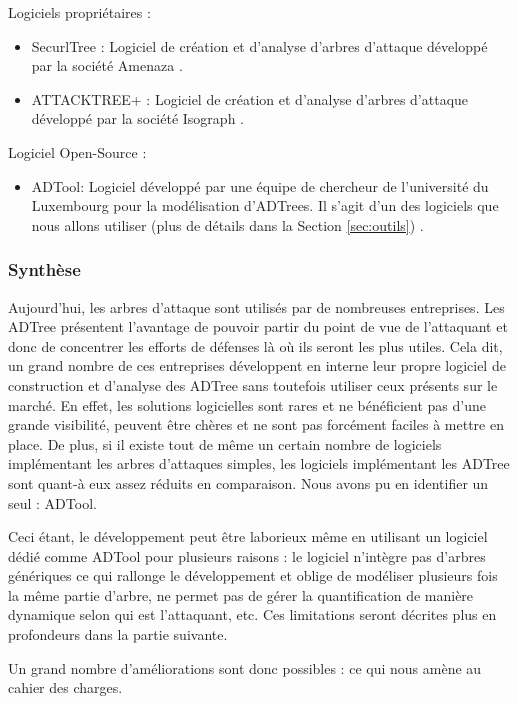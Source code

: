         Logiciels propriétaires :
        \begin{itemize}
	        \item SecurlTree : Logiciel de création et d'analyse d'arbres d'attaque développé par la société Amenaza \cite{SecurlTree}.
	        \item ATTACKTREE+ : Logiciel de création et d'analyse d'arbres d'attaque développé par la société Isograph \cite{ATTACKTREE+}.
        \end{itemize}
        
        Logiciel Open-Source :
        \begin{itemize}
        	\item ADTool: Logiciel développé par une équipe de chercheur de l'université du Luxembourg pour la modélisation d'ADTrees. Il s'agit d'un des logiciels que nous allons utiliser (plus de détails dans la Section \ref{sec:outils}) \cite{ADTool}.
        \end{itemize}

        \subsubsection{Synthèse}
            Aujourd'hui, les arbres d'attaque sont utilisés par de nombreuses entreprises. Les ADTree présentent l'avantage de pouvoir partir du point de vue de l'attaquant et donc de concentrer les efforts de défenses là où ils seront les plus utiles. Cela dit, un grand nombre de ces entreprises développent en interne leur propre logiciel de construction et d'analyse des ADTree sans toutefois utiliser ceux présents sur le marché. En effet, les solutions logicielles sont rares et ne bénéficient pas d'une grande visibilité, peuvent être chères et ne sont pas forcément faciles à mettre en place. De plus, si il existe tout de même un certain nombre de logiciels implémentant les arbres d'attaques simples, les logiciels implémentant les ADTree sont quant-à eux assez réduits en comparaison. Nous avons pu en identifier un seul : ADTool. 

            Ceci étant, le développement peut être laborieux même en utilisant un logiciel dédié comme ADTool pour plusieurs raisons : le logiciel n’intègre pas d'arbres génériques ce qui rallonge le développement et oblige de modéliser plusieurs fois la même partie d'arbre, ne permet pas de gérer la quantification de manière dynamique selon qui est l'attaquant, etc. Ces limitations seront décrites plus en profondeurs dans la partie suivante.

            Un grand nombre d'améliorations sont donc possibles : ce qui nous amène au cahier des charges.
